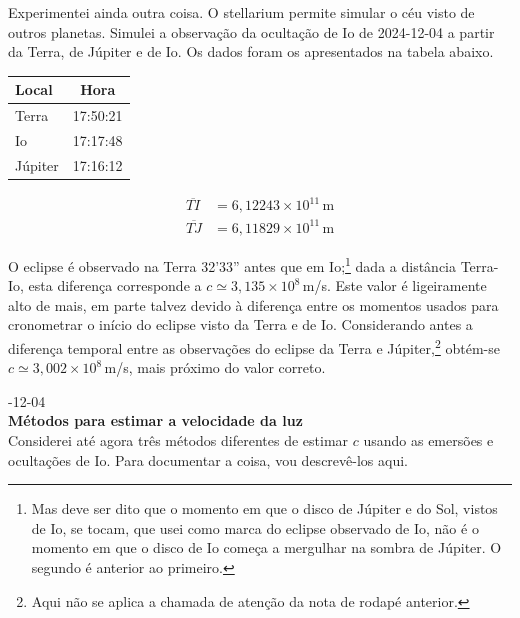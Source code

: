 \documentclass[]{article}
\newcommand{\newlog}[2]{%
  \par
  \vspace{\baselineskip}
  \noindent
  #1\\
  \textbf{#2}\\
}
\begin{document}
Experimentei ainda outra coisa. O stellarium permite simular o céu visto de
outros planetas. Simulei a observação da ocultação de Io de 2024-12-04 a partir
da Terra, de Júpiter e de Io. Os dados foram os apresentados na tabela abaixo.
\begin{center}
  \begin{minipage}[c]{0.4\linewidth}
    \begin{tabular}{l|c}
      \hline
      Local& Hora\\
      \hline
      Terra   & 17:50:21\\
      Io&       17:17:48\\
      Júpiter & 17:16:12\\
      \hline
    \end{tabular}
  \end{minipage}
  \begin{minipage}[c]{0.4\linewidth}
    \begin{align*}
      \overline{TI}&=6,12243\times10^{11}\,\text{m}\\
      \overline{TJ}&=6,11829\times10^{11}\,\text{m}
    \end{align*}
  \end{minipage}
\end{center}
O eclipse é observado na Terra 32'33'' antes que em Io;\footnote{Mas deve ser
  dito que o momento em que o disco de Júpiter e do Sol, vistos de Io, se tocam,
  que usei como marca do eclipse observado de Io, não é o momento em que o disco
  de Io começa a mergulhar na sombra de Júpiter.  O segundo é anterior ao
primeiro.} dada a distância Terra-Io, esta diferença corresponde a
$c\simeq3,135\times10^8$\,m/s. Este valor é ligeiramente alto de mais, em parte
talvez devido à diferença entre os momentos usados para cronometrar o início do
eclipse visto da Terra e de Io. 
Considerando antes a diferença temporal entre as
observações do eclipse da Terra e Júpiter,\footnote{Aqui não se aplica a
chamada de atenção da nota de rodapé anterior.} obtém-se
$c\simeq3,002\times10^8$\,m/s, mais próximo do valor correto.
 
\newlog{2024-12-04}{Métodos para estimar a velocidade da luz}
Considerei até agora três métodos diferentes de estimar $c$ usando as emersões e
ocultações de Io. Para documentar a coisa, vou descrevê-los aqui.
\end{document}

